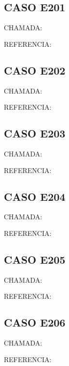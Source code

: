 \documentclass{undftex}
\begin{document}
\begin{refsection}\section*{CASO E201}\noindent CHAMADA: \par\noindent REFERENCIA:\par\printbibliography[heading=none]\end{refsection}\clearpage
\begin{refsection}\section*{CASO E202}\noindent CHAMADA: \par\noindent REFERENCIA:\par\printbibliography[heading=none]\end{refsection}\clearpage
\begin{refsection}\section*{CASO E203}\noindent CHAMADA: \par\noindent REFERENCIA:\par\printbibliography[heading=none]\end{refsection}\clearpage
\begin{refsection}\section*{CASO E204}\noindent CHAMADA: \par\noindent REFERENCIA:\par\printbibliography[heading=none]\end{refsection}\clearpage
\begin{refsection}\section*{CASO E205}\noindent CHAMADA: \par\noindent REFERENCIA:\par\printbibliography[heading=none]\end{refsection}\clearpage
\begin{refsection}\section*{CASO E206}\noindent CHAMADA: \par\noindent REFERENCIA:\par\printbibliography[heading=none]\end{refsection}\clearpage
\end{document}
